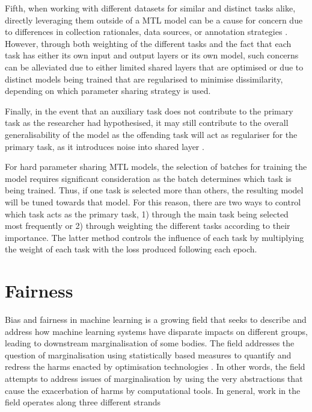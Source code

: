 Fifth, when working with different datasets for similar and distinct tasks alike, directly leveraging them outside of a MTL model can be a cause for concern due to differences in collection rationales, data sources, or annotation strategies \cite{Waseem:2018}. 
However, through both weighting of the different tasks and the fact that each task has either its own input and output layers or its own model, such concerns can be alleviated due to either limited shared layers that are optimised or due to distinct models being trained that are regularised to minimise dissimilarity, depending on which parameter sharing strategy is used.

Finally, in the event that an auxiliary task does not contribute to the primary task as the researcher had hypothesised, it may still contribute to the overall generalisability of the model as the offending task will act as regulariser for the primary task, as it introduces noise into shared layer \citep{Bingel:2018}.

For hard parameter sharing MTL models, the selection of batches for training the model requires significant consideration as the batch determines which task is being trained. Thus, if one task is selected more than others, the resulting model will be tuned towards that model.
For this reason, there are two ways to control which task acts as the primary task, 1) through the main task being selected most frequently or 2) through weighting the different tasks according to their importance.
The latter method controls the influence of each task by multiplying the weight of each task with the loss produced following each epoch.

\section{Fairness}\label{sec:fairlitt}

Bias and fairness in machine learning is a growing field that seeks to describe and address how machine learning systems have disparate impacts on different groups, leading to downstream marginalisation of some bodies. 
The field addresses the question of marginalisation using statistically based measures to quantify and redress the harms enacted by optimisation technologies \citep{Kulynych:2020}.
In other words, the field attempts to address issues of marginalisation by using the very abstractions that cause the exacerbation of harms by computational tools.
In general, work in the field operates along three different strands

